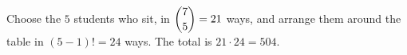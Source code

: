 Choose the $5$ students who sit, in $\dbinom75=21$ ways, and arrange them around the table in $(5-1)!=24$ ways. The total is $21\cdot24=\boxed{504}$.
